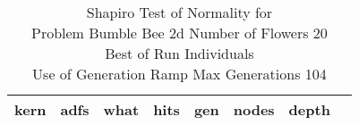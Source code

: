 \begin{table}[H]
\caption{Shapiro Test of Normality for \\ Problem  Bumble Bee 2d  Number of Flowers 20\\Best of Run Individuals \\ Use of Generation Ramp  Max Generations 104\\}
\begin{center}
\scalebox{0.8} %
{
\begin{tabular}{lrrrrrrr}
\hline
kern & adfs & what & hits & gen & nodes & depth \\
\hline


\end{tabular}
}
\end{center}
\end{table}

